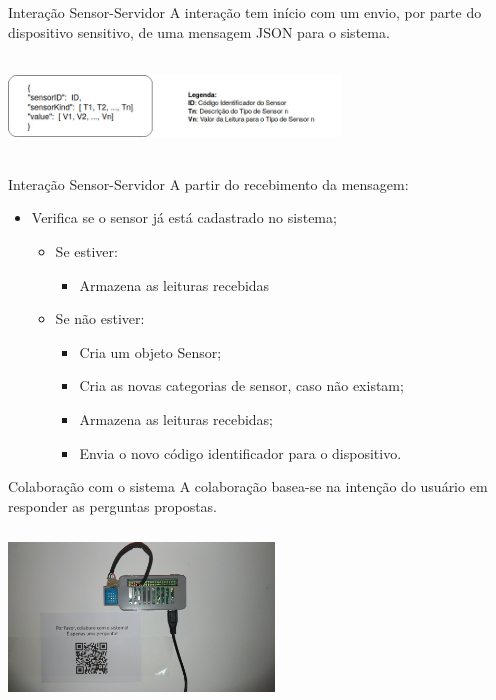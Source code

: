 \documentclass{beamer}
\begin{document}
    \begin{frame}{Interação Sensor-Servidor}
      A interação tem início com um envio, por parte do dispositivo sensitivo, de uma mensagem JSON para o sistema.
      \begin{center}
      \includegraphics[height=75pt, width=250pt]{mensagemJSON}
      \end{center}
    \end{frame}
    \begin{frame}{Interação Sensor-Servidor}
      A partir do recebimento da mensagem:
      \begin{itemize}
        \item Verifica se o sensor já está cadastrado no sistema;
          \begin{itemize}
            \item Se estiver:
            \begin{itemize}
              \item Armazena as leituras recebidas
            \end{itemize}
            \item Se não estiver:
            \begin{itemize}
              \item Cria um objeto Sensor;
              \item Cria as novas categorias de sensor, caso não existam;
              \item Armazena as leituras recebidas;
              \item Envia o novo código identificador para o dispositivo.
            \end{itemize}
          \end{itemize}
      \end{itemize}
    \end{frame}

    \begin{frame}{Colaboração com o sistema}
      A colaboração basea-se na intenção do usuário em responder as perguntas propostas.
      \begin{center}
      \includegraphics[height=130pt, width=200pt]{sensormsg}
      \end{center}
    \end{frame}
\end{document}
